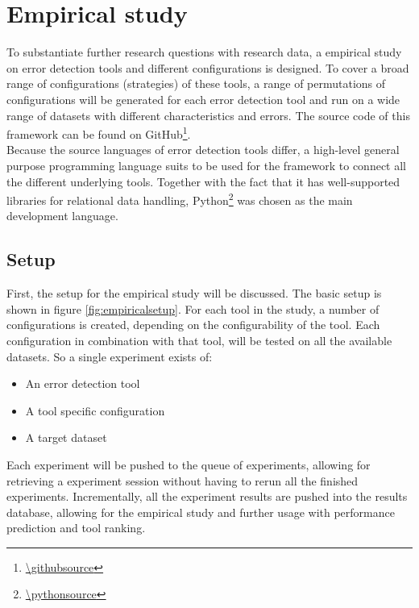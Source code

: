 \section{Empirical study}
\label{sec:empiricalstudy}
To substantiate further research questions with research data, a empirical study on error detection tools and different configurations is designed. To cover a broad range of configurations (strategies) of these tools, a range of permutations of configurations will be generated for each error detection tool and run on a wide range of datasets with different characteristics and errors. The source code of this framework can be found on GitHub\footnote{\url{\githubsource}}.
~\\Because the source languages of error detection tools differ, a high-level general purpose programming language suits to be used for the framework to connect all the different underlying tools. Together with the fact that it has well-supported libraries for relational data handling, Python\footnote{\url{\pythonsource}} was chosen as the main development language.


\subsection{Setup}
\label{subsec:setup}
First, the setup for the empirical study will be discussed. The basic setup is shown in figure \ref{fig:empiricalsetup}. For each tool in the study, a number of configurations is created, depending on the configurability of the tool. Each configuration in combination with that tool, will be tested on all the available datasets. So a single experiment exists of:
\begin{itemize}
    \item An error detection tool
    \item A tool specific configuration
    \item A target dataset
\end{itemize}

Each experiment will be pushed to the queue of experiments, allowing for retrieving a experiment session without having to rerun all the finished experiments. Incrementally, all the experiment results are pushed into the results database, allowing for the empirical study and further usage with performance prediction and tool ranking. 


